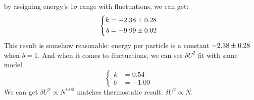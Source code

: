 \documentclass[UTF8,a4paper]{article}
\begin{document}
by assigning energy's $1\sigma$ range with fluctuations, we can get:
\begin{equation}
	\left\{
		\begin{aligned}
			k &= \num[separate-uncertainty = true]{-2.38+-0.28}\\
			b &= \num[separate-uncertainty = true]{-9.99+-0.02}
		\end{aligned}
	\right.
\end{equation}
This result is somehow reasonable: energy per particle is a constant $\num[separate-uncertainty = true]{-2.38+-0.28}$ when $b = 1$. And when it comes to fluctuations, we can see $\delta U^2$ fit with same model 
\begin{equation}
	\left\{
		\begin{aligned}
			k &= 0.54\\
			b &= -1.00
		\end{aligned}
	\right.
\end{equation}
We can get $\delta U^2\propto N^{1.00}$ matches thermostatic result: $\delta U^2\propto N$.
\end{document}
